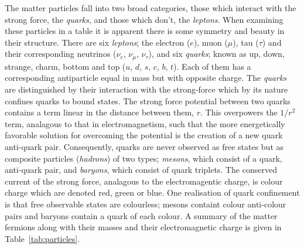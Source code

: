 The matter particles fall into two broad categories, those which interact with the strong force, the \textit{quarks}, and those which don't, the \textit{leptons}. When examining these particles in a table it is apparent there is some symmetry and beauty in their structure. There are six \textit{leptons}; the electron ($e$), muon ($\mu$), tau ($\tau$) and their corresponding neutrinos ($\nu_{e}$, $\nu_{\mu}$, $\nu_{\tau}$), and six \textit{quarks}; known as up, down, strange, charm, bottom and top ($u$, $d$, $s$, $c$, $b$, $t$). Each of them has a corresponding antiparticle equal in mass but with opposite charge. The \textit{quarks} are distinguished by their interaction with the strong-force which by its nature confines quarks to bound states. The strong force potential between two quarks contains a term linear in the distance between them, $r$. This overpowers the $1/r^{2}$ term, analagous to that in electromagnetism, such that the more energetically favorable solution for overcoming the potential is the creation of a new quark anti-quark pair. Consequently, quarks are never observed as free states but as composite particles (\textit{hadrons}) of two types; \textit{mesons}, which consist of a quark, anti-quark pair, and \textit{baryons}, which consist of quark triplets. The conserved current of the strong force, analagous to the electromagentic charge, is colour charge which are denoted red, green or blue. One realisation of quark confinement is that free observable states are colourless; mesons containt colour anti-colour pairs and baryons contain a quark of each colour. A summary of the matter fermions along with their masses and their electromagnetic charge is given in Table~\ref{tab:particles}.


